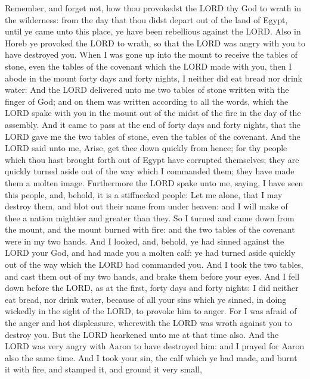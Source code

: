  Remember, and forget not, how thou provokedst the LORD thy
God to wrath in the wilderness: from the day that thou didst depart out
of the land of Egypt, until ye came unto this place, ye have been
rebellious against the LORD.  Also in Horeb ye provoked the
LORD to wrath, so that the LORD was angry with you to have destroyed
you.  When I was gone up into the mount to receive the
tables of stone, even the tables of the covenant which the LORD made
with you, then I abode in the mount forty days and forty nights, I
neither did eat bread nor drink water:  And the LORD
delivered unto me two tables of stone written with the finger of God;
and on them was written according to all the words, which the LORD spake
with you in the mount out of the midst of the fire in the day of the
assembly.  And it came to pass at the end of forty days and
forty nights, that the LORD gave me the two tables of stone, even the
tables of the covenant.  And the LORD said unto me, Arise,
get thee down quickly from hence; for thy people which thou hast brought
forth out of Egypt have corrupted themselves; they are quickly turned
aside out of the way which I commanded them; they have made them a
molten image.  Furthermore the LORD spake unto me, saying,
I have seen this people, and, behold, it is a stiffnecked people:
 Let me alone, that I may destroy them, and blot out their
name from under heaven: and I will make of thee a nation mightier and
greater than they.  So I turned and came down from the
mount, and the mount burned with fire: and the two tables of the
covenant were in my two hands.  And I looked, and, behold,
ye had sinned against the LORD your God, and had made you a molten calf:
ye had turned aside quickly out of the way which the LORD had commanded
you.  And I took the two tables, and cast them out of my
two hands, and brake them before your eyes.  And I fell
down before the LORD, as at the first, forty days and forty nights: I
did neither eat bread, nor drink water, because of all your sins which
ye sinned, in doing wickedly in the sight of the LORD, to provoke him to
anger.  For I was afraid of the anger and hot displeasure,
wherewith the LORD was wroth against you to destroy you. But the LORD
hearkened unto me at that time also.  And the LORD was very
angry with Aaron to have destroyed him: and I prayed for Aaron also the
same time.  And I took your sin, the calf which ye had
made, and burnt it with fire, and stamped it, and ground it very small,
